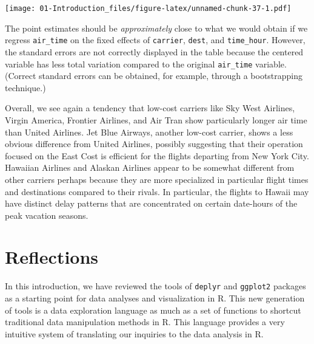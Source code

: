 \documentclass[]{book}
\newenvironment{Shaded}{\begin{snugshade}}{\end{snugshade}}
\newcommand{\KeywordTok}[1]{\textcolor[rgb]{0.13,0.29,0.53}{\textbf{{#1}}}}
\newcommand{\DataTypeTok}[1]{\textcolor[rgb]{0.13,0.29,0.53}{{#1}}}
\newcommand{\StringTok}[1]{\textcolor[rgb]{0.31,0.60,0.02}{{#1}}}
\newcommand{\NormalTok}[1]{{#1}}
\theoremstyle{definition}
\theoremstyle{definition}
\theoremstyle{remark}
\begin{document}
\begin{Shaded}
\end{Shaded}

\texttt{[image: 01-Introduction\_files/figure-latex/unnamed-chunk-37-1.pdf]}

The point estimates should be \emph{approximately} close to what we
would obtain if we regress \texttt{air\_time} on the fixed effects of
\texttt{carrier}, \texttt{dest}, and \texttt{time\_hour}. However, the
standard errors are not correctly displayed in the table because the
centered variable has less total variation compared to the original
\texttt{air\_time} variable. (Correct standard errors can be obtained,
for example, through a bootstrapping technique.)

Overall, we see again a tendency that low-cost carriers like Sky West
Airlines, Virgin America, Frontier Airlines, and Air Tran show
particularly longer air time than United Airlines. Jet Blue Airways,
another low-cost carrier, shows a less obvious difference from United
Airlines, possibly suggesting that their operation focused on the East
Cost is efficient for the flights departing from New York City. Hawaiian
Airlines and Alaskan Airlines appear to be somewhat different from other
carriers perhaps because they are more specialized in particular flight
times and destinations compared to their rivals. In particular, the
flights to Hawaii may have distinct delay patterns that are concentrated
on certain date-hours of the peak vacation seasons.

\section{Reflections}\label{reflections}

In this introduction, we have reviewed the tools of \texttt{deplyr} and
\texttt{ggplot2} packages as a starting point for data analyses and
visualization in R. This new generation of tools is a data exploration
language as much as a set of functions to shortcut traditional data
manipulation methods in R. This language provides a very intuitive
system of translating our inquiries to the data analysis in R.
\end{document}
